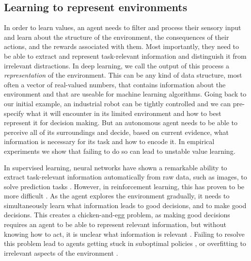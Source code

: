 \subsection{Learning to represent environments}


In order to learn values, an agent needs to filter and process their sensory input and learn about the structure of the environment, the consequences of their actions, and the rewards associated with them.
Most importantly, they need to be able to extract and represent task-relevant information and distinguish it from irrelevant distractions.
In deep learning, we call the output of this process a \emph{representation} of the environment.
This can be any kind of data structure, most often a vector of real-valued numbers, that contains information about the environment and that are useable for machine learning algorithms.
Going back to our initial example, an industrial robot can be tightly controlled and we can pre-specify what it will encounter in its limited environment and how to best represent it for decision making.
But an autonomous agent needs to be able to perceive all of its surroundings and decide, based on current evidence, what information is necessary for its task and how to encode it.
In empirical experiments \parencite{hussing2024dissecting,voelcker2024when,voelcker2022value} we show that failing to do so can lead to unstable value learning.

In supervised learning, neural networks have shown a remarkable ability to extract task-relevant information automatically from raw data, such as images, to solve prediction tasks \parencite{goodfellow2016deep}.
However, in reinforcement learning, this has proven to be more difficult \parencite{jaderberg2017reinforcement,igl2021transient,lyle2021effect,kumar2021implicit,nikishin2022primacy,hussing2024dissecting}.
As the agent explores the environment gradually, it needs to simultaneously learn what information leads to good decisions, and to make good decisions.
This creates a chicken-and-egg problem, as making good decisions requires an agent to be able to represent relevant information, but without knowing how to act, it is unclear what information is relevant \parencite{igl2021transient,voelcker2022value}.
Failing to resolve this problem lead to agents getting stuck in suboptimal policies \parencite{kumar2021implicit,nikishin2022primacy}, or overfitting to irrelevant aspects of the environment \parencite{song2020observational}.

